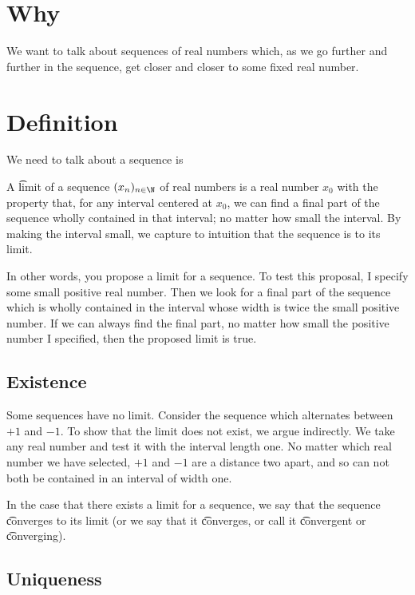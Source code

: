 
\section*{Why}

We want to talk about sequences of real numbers which, as we go further and further in the sequence, get closer and closer to some fixed real number.

\section*{Definition}

We need to talk about  a sequence is 

A \t{limit} of a sequence $(x_n)_{n \in \N }$ of real numbers is a real number $x_0$ with the property that, for any interval centered at $x_0$, we can find a final part of the sequence wholly contained in that interval; no matter how small the interval.
By making the interval small, we capture to intuition that the sequence is  to its limit.

In other words, you propose a limit for a sequence.
To test this proposal, I specify some small positive real number.
Then we look for a final part of the sequence which is wholly contained in the interval whose width is twice the small positive number.
If we can always find the final part, no matter how small the positive number I specified, then the proposed limit is true.

\subsection*{Existence}

Some sequences have no limit.
Consider the sequence which alternates between $+1$ and $-1$.
To show that the limit does not exist, we argue indirectly.
We take any real number and test it with the interval length one.
No matter which real number we have selected, $+1$ and $-1$ are a distance two apart, and so can not both be contained in an interval of width one.

In the case that there exists a limit for a sequence, we say that the sequence \t{converges to} its limit (or we say that it \t{converges}, or call it \t{convergent} or \t{converging}).

\subsection*{Uniqueness}

